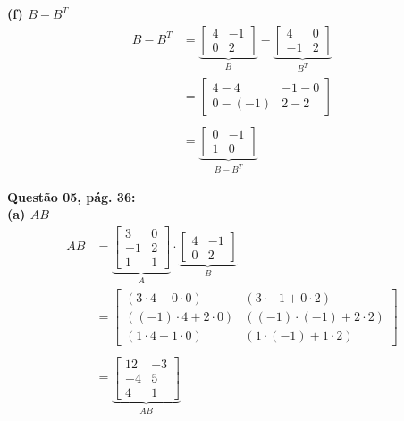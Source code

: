 \documentclass[a4paper,12pt]{article}
\begin{document}
\textbf{(f) $B - B^{T}$}
\begin{align*}
B - B^{T}&=
    \underbrace{
    \begin{bmatrix}
        4 & -1\\
        0 & 2
    \end{bmatrix}}_{B} 
    -
    \underbrace{
    \begin{bmatrix}
        4 & 0\\
        -1 & 2
    \end{bmatrix}}_{B^{T}} \\
    &=
    \begin{bmatrix}
        4 - 4 & -1 - 0\\
        0 - (-1) & 2 - 2
    \end{bmatrix} \\ \\
    &=
    \underbrace{
    \begin{bmatrix}
        0 & -1\\
        1 & 0
    \end{bmatrix}}_{B - B^{T}} 
\end{align*}

\textbf{Questão 05, pág. 36:}\\
\textbf{(a) $AB$}
\begin{align*}
AB&=
    \underbrace{
    \begin{bmatrix}
        3 & 0\\
        -1 & 2\\
        1 & 1
    \end{bmatrix}}_{A} 
    \cdot
    \underbrace{
    \begin{bmatrix}
        4 & -1\\
        0 & 2
    \end{bmatrix}}_{B} \\
    &=
    \begin{bmatrix}
        (3\cdot 4 + 0 \cdot 0) & (3 \cdot -1 + 0 \cdot 2)\\
        ((-1) \cdot 4 + 2 \cdot 0) & ((-1) \cdot (-1) + 2 \cdot 2)\\
        (1 \cdot 4 + 1 \cdot 0) & (1 \cdot (-1) + 1 \cdot 2)
    \end{bmatrix} \\ \\
    &=
    \underbrace{
    \begin{bmatrix}
        12 & -3\\
        -4 & 5 \\
        4 & 1
    \end{bmatrix}}_{AB} 
\end{align*}
\end{document}
